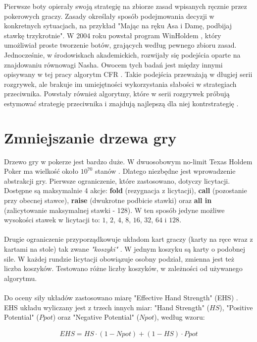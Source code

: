 \documentclass[magisterska]{pracamgr}
\begin{document}
Pierwsze boty opierały swoją strategię na zbiorze zasad wpisanych ręcznie przez pokerowych graczy. Zasady określały
sposób podejmowania decyzji w konkretnych sytuacjach, na przykład "Mając na ręku Asa i Damę, podbijaj stawkę trzykrotnie".
W 2004 roku powstał program WinHoldem \cite{winholdem}, który umożliwiał proste tworzenie botów, grających według pewnego zbioru zasad.
Jednocześnie, w środowiskach akademickich, rozwijały się podejścia oparte na znajdowaniu równowagi Nasha. Owocem tych
badań jest między innymi opisywany w tej pracy algorytm CFR \cite{cfr, cfr2, cfr3}. Takie podejścia przeważają w długiej serii rozgrywek, ale
brakuje im umiejętności wykorzystania słabości w strategiach przeciwnika. Powstały również algorytmy, które w serii
rozgrywek próbują estymować strategię przeciwnika i znajdują najlepszą dla niej kontrstrategię \cite{exploit}.

\section{Zmniejszanie drzewa gry}

Drzewo gry w pokerze jest bardzo duże. W dwuosobowym no-limit Texas Holdem Poker ma wielkość
około $10^{70}$ stanów \cite{monte-carlo}. Dlatego niezbędne jest wprowadzenie abstrakcji gry.
Pierwsze ograniczenie, które zastosowano, dotyczy licytacji. Dostępne są maksymalnie 4 akcje:
\textbf{fold} (rezygnacja z licytacji), \textbf{call} (pozostanie przy obecnej stawce), \textbf{raise} (dwukrotne podbicie stawki) oraz
\textbf{all in} (zalicytowanie maksymalnej stawki - 128). W ten sposób jedyne możliwe wysokości stawek w licytacji to: $1$, $2$,
$4$, $8$, $16$, $32$, $64$ i $128$. \\\\
\noindent
Drugie ograniczenie przyporządkowuje układom kart graczy (karty na ręce wraz z kartami na stole) tak zwane \emph{"koszyki"} \cite[punkt 4.4]{buckets}.
W jednym koszyku są karty o podobnej sile. W każdej rundzie licytacji obowiązuje osobny podział, zmienna
jest też liczba koszyków. Testowano różne liczby koszyków, w zależności od używanego algorytmu. \\\\
\noindent
Do oceny siły układów zastosowano miarę "Effective Hand Strength" (EHS) \cite{ehs}. EHS układu wyliczany
jest z trzech innych miar: "Hand Strength" ($HS$), "Positive Potential" ($Ppot$) oraz "Negative Potential" ($Npot$), według
wzoru:

\begin{align*}
EHS = HS \cdot (1 - Npot) + (1 - HS) \cdot Ppot
\end{align*}
\end{document}
